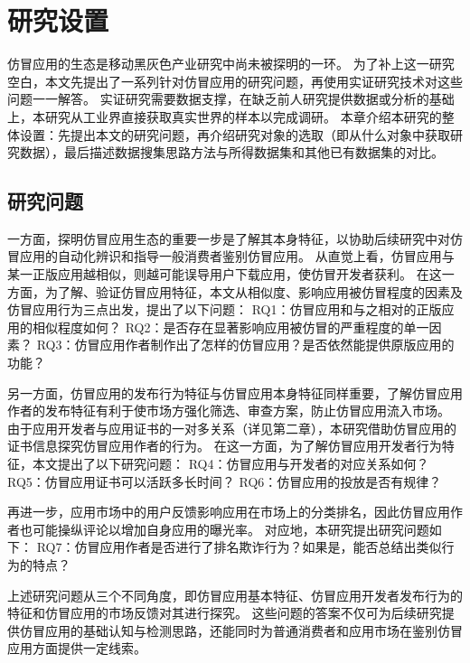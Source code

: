 \chapter{研究设置}
\label{chp:data_description}

仿冒应用的生态是移动黑灰色产业研究中尚未被探明的一环。
为了补上这一研究空白，本文先提出了一系列针对仿冒应用的研究问题，再使用实证研究技术对这些问题一一解答。
实证研究需要数据支撑，在缺乏前人研究提供数据或分析的基础上，本研究从工业界直接获取真实世界的样本以完成调研。
本章介绍本研究的整体设置：先提出本文的研究问题，再介绍研究对象的选取（即从什么对象中获取研究数据），最后描述数据搜集思路方法与所得数据集和其他已有数据集的对比。


\section{研究问题}

一方面，探明仿冒应用生态的重要一步是了解其本身特征，以协助后续研究中对仿冒应用的自动化辨识和指导一般消费者鉴别仿冒应用。
从直觉上看，仿冒应用与某一正版应用越相似，则越可能误导用户下载应用，使仿冒开发者获利。
在这一方面，为了解、验证仿冒应用特征，本文从相似度、影响应用被仿冒程度的因素及仿冒应用行为三点出发，提出了以下问题：
RQ1：仿冒应用和与之相对的正版应用的相似程度如何？
RQ2：是否存在显著影响应用被仿冒的严重程度的单一因素？
RQ3：仿冒应用作者制作出了怎样的仿冒应用？是否依然能提供原版应用的功能？

另一方面，仿冒应用的发布行为特征与仿冒应用本身特征同样重要，了解仿冒应用作者的发布特征有利于使市场方强化筛选、审查方案，防止仿冒应用流入市场。
由于应用开发者与应用证书的一对多关系（详见第二章），本研究借助仿冒应用的证书信息探究仿冒应用作者的行为。
在这一方面，为了解仿冒应用开发者行为特征，本文提出了以下研究问题：
RQ4：仿冒应用与开发者的对应关系如何？
RQ5：仿冒应用证书可以活跃多长时间？
RQ6：仿冒应用的投放是否有规律？

再进一步，应用市场中的用户反馈影响应用在市场上的分类排名，因此仿冒应用作者也可能操纵评论以增加自身应用的曝光率。
对应地，本研究提出研究问题如下：
RQ7：仿冒应用作者是否进行了排名欺诈行为？如果是，能否总结出类似行为的特点？

上述研究问题从三个不同角度，即仿冒应用基本特征、仿冒应用开发者发布行为的特征和仿冒应用的市场反馈对其进行探究。
这些问题的答案不仅可为后续研究提供仿冒应用的基础认知与检测思路，还能同时为普通消费者和应用市场在鉴别仿冒应用方面提供一定线索。

